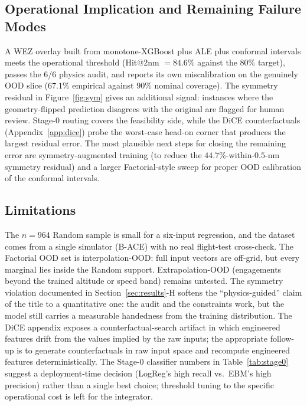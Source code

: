 \documentclass[conference]{IEEEtran}
\begin{document}
\subsection{Operational Implication and Remaining Failure Modes}
A WEZ overlay built from monotone-XGBoost plus ALE plus conformal intervals meets the operational threshold (Hit@2nm $=84.6\%$ against the $80\%$ target), passes the 6/6 physics audit, and reports its own miscalibration on the genuinely OOD slice ($67.1\%$ empirical against $90\%$ nominal coverage). The symmetry residual in Figure~\ref{fig:sym} gives an additional signal: instances where the geometry-flipped prediction disagrees with the original are flagged for human review. Stage-0 routing covers the feasibility side, while the DiCE counterfactuals (Appendix~\ref{app:dice}) probe the worst-case head-on corner that produces the largest residual error. The most plausible next steps for closing the remaining error are symmetry-augmented training (to reduce the $44.7\%$-within-$0.5$-nm symmetry residual) and a larger Factorial-style sweep for proper OOD calibration of the conformal intervals.

\subsection{Limitations}
The $n=964$ Random sample is small for a six-input regression, and the dataset comes from a single simulator (B-ACE) with no real flight-test cross-check. The Factorial OOD set is interpolation-OOD: full input vectors are off-grid, but every marginal lies inside the Random support. Extrapolation-OOD (engagements beyond the trained altitude or speed band) remains untested. The symmetry violation documented in Section~\ref{sec:results}-H softens the ``physics-guided'' claim of the title to a quantitative one: the audit and the constraints work, but the model still carries a measurable handedness from the training distribution. The DiCE appendix exposes a counterfactual-search artifact in which engineered features drift from the values implied by the raw inputs; the appropriate follow-up is to generate counterfactuals in raw input space and recompute engineered features deterministically. The Stage-0 classifier numbers in Table~\ref{tab:stage0} suggest a deployment-time decision (LogReg's high recall vs.\ EBM's high precision) rather than a single best choice; threshold tuning to the specific operational cost is left for the integrator.

\end{document}
